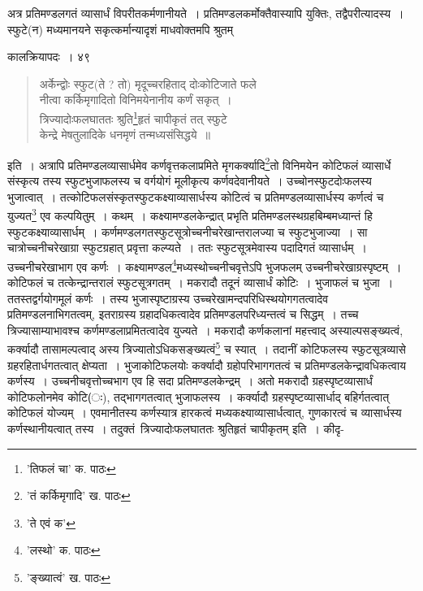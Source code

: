 \documentclass[11pt, openany]{book}
\begin{document}
{{{{{\noindent अत्र प्रतिमण्डलगतं व्यासार्धं विपरीतकर्मणानीयते~। प्रतिमण्डलकर्मोक्तैवास्यापि युक्तिः, तद्वैपरीत्यादस्य~। स्फुटे(न) मध्यमानयने सकृत्कर्मान्यादृशं माधवोक्तमपि श्रुतम्\textendash 

\newpage

\vspace{3cm} \hspace{4cm}कालक्रियापदः~।\hspace{4cm} ४९

\vspace{0.3cm}
\begin{quote}
{\qt अर्केन्द्वोः स्फुट(ते ? तो) मृदूच्चरहिताद् दोःकोटिजाते फले\\
नीत्वा कर्किमृगादितो विनिमयेनानीय कर्णं सकृत्~।\\
त्रिज्यादोःफलघाततः श्रुति\renewcommand{\thefootnote}{१}\footnote{'तिफलं चा' क. पाठः}हृतं चापीकृतं तत् स्फुटे\\
केन्द्रे मेषतुलादिके धनमृणं तन्मध्यसंसिद्धये~॥}
\end{quote}

\noindent इति~। अत्रापि प्रतिमण्डलव्यासार्धमेव कर्णवृत्तकलाप्रमिते मृगकर्क्यादि\renewcommand{\thefootnote}{२}\footnote{'तं कर्किमृगादि' ख. पाठः}तो विनिमयेन कोटिफलं व्यासार्धे संस्कृत्य तस्य स्फुटभुजाफलस्य च वर्गयोगं मूलीकृत्य कर्णवदेवानीयते~। उच्चोनस्फुटदोःफलस्य भुजात्वात्~। तत्कोटिफलसंस्कृतस्फुटकक्ष्याव्यासार्धस्य कोटित्वं च प्रतिमण्डलव्यासार्धस्य कर्णत्वं च युज्यत\renewcommand{\thefootnote}{३}\footnote{'ते एवं क'} एव कल्पयितुम्~। कथम्~। कक्ष्यामण्डलकेन्द्रात् प्रभृति
प्रतिमण्डलस्थग्रहबिम्बमध्यान्तं हि स्फुटकक्ष्याव्यासार्धम्~। कर्णमण्डलगतस्फुटसूत्रोच्चनीचरेखान्तरालज्या च स्फुटभुजाज्या~। सा चात्रोच्चनीचरेखाग्रा स्फुटग्रहात् प्रवृत्ता कल्प्यते~। ततः स्फुटसूत्रमेवास्य पदादिगतं व्यासार्धम्~। उच्चनीचरेखाभाग एव कर्णः~। कक्ष्यामण्डल\renewcommand{\thefootnote}{४}\footnote{'लस्थो' क. पाठः}मध्यस्थोच्चनीचवृत्तेऽपि भुजफलम् उच्चनीचरेखाग्रस्पृष्टम्~। कोटिफलं च तत्केन्द्रान्तरालं स्फुटसूत्रगतम्~। मकरादौ तदूनं व्यासार्धं कोटिः~। भुजाफलं च भुजा~। ततस्तद्वर्गयोगमूलं कर्णः~। तस्य भुजास्पृष्टाग्रस्य उच्चरेखामन्दपरिधिस्थयोगगतत्वादेव प्रतिमण्डलनाभिगतत्वम्, इतराग्रस्य ग्रहादधिकत्वादेव प्रतिमण्डलपरिध्यन्तत्वं च सिद्धम्~। तच्च त्रिज्यासाम्याभावश्च कर्णमण्डलाप्रमितत्वादेव युज्यते~। मकरादौ कर्णकलानां महत्त्वाद् अस्याल्पसङ्ख्यत्वं, कर्क्यादौ तासामल्पत्वाद् अस्य त्रिज्यातोऽधिकसङ्ख्यत्वं\renewcommand{\thefootnote}{५}\footnote{ 'ङ्ख्यात्वं' ख. पाठः} च स्यात्~। तदानीं कोटिफलस्य स्फुटसूत्रव्यासे ग्रहरहितार्धगतत्वात् क्षेप्यता~। भुजाकोटिफलयोः कर्क्यादौ ग्रहोपरिभागगतत्वं च प्रतिमण्डलकेन्द्रावधिकत्वाय कर्णस्य~। उच्चनीचवृत्तोच्चभाग एव हि सदा प्रतिमण्डलकेन्द्रम्~। अतो मकरादौ ग्रहस्पृष्टव्यासार्धं कोटिफलोनमेव कोटि(ः), तद्भागगतत्वात् भुजाफलस्य~। कर्क्यादौ ग्रहस्पृष्टव्यासार्धाद् बहिर्गतत्वात् कोटिफलं योज्यम्~। एवमानीतस्य कर्णस्यात्र हारकत्वं मध्यकक्ष्याव्यासार्धत्वात्, गुणकारत्वं च व्यासार्धस्य कर्णस्थानीयत्वात् तस्य~। तदुक्तं\textendash\ {\qt त्रिज्यादोःफलघाततः श्रुतिहृतं चापीकृतम्} इति~। कीदृ-

}}}}}
\end{document}
